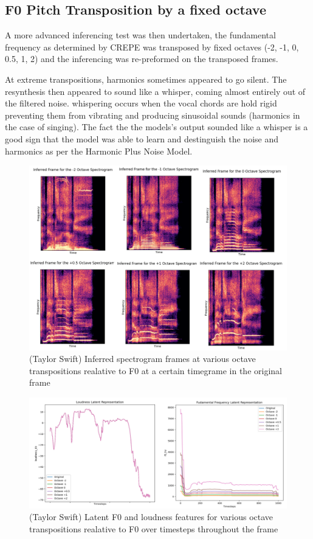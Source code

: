 \subsection{F0 Pitch Transposition by a fixed octave}

A more advanced inferencing test was then undertaken, the fundamental frequency as determined by CREPE was transposed by fixed octaves (-2, -1, 0, 0.5, 1, 2) and the inferencing was re-preformed on the transposed frames.

At extreme transpositions, harmonics sometimes appeared to go silent. The resynthesis then appeared to sound like a whisper, coming almost entirely out of the filtered noise. whispering occurs when the vocal chords are hold rigid preventing them from vibrating and producing sinusoidal sounds (harmonics in the case of singing). The fact the the models's output sounded like a whisper is a good sign that the model was able to learn and destinguish the noise and harmonics as per the Harmonic Plus Noise Model\cite{HarmonicPlusNoise}\cite{OriginalDDSP}.

\begin{figure}
    \centering
    \includegraphics[width=\textwidth]{research/results/TaylorSwift/InferredTranspositions.png}
    \caption{(Taylor Swift) Inferred spectrogram frames at various octave transpositions realative to F0 at a certain timegrame in the original frame}
\end{figure}

\begin{figure}
    \centering
    \includegraphics[width=\textwidth]{research/results/TaylorSwift/InferredTranspositionsGraphs.png}
    \caption{(Taylor Swift) Latent F0 and loudness features for various octave transpositions realative to F0 over timesteps throughout the frame}
\end{figure}

